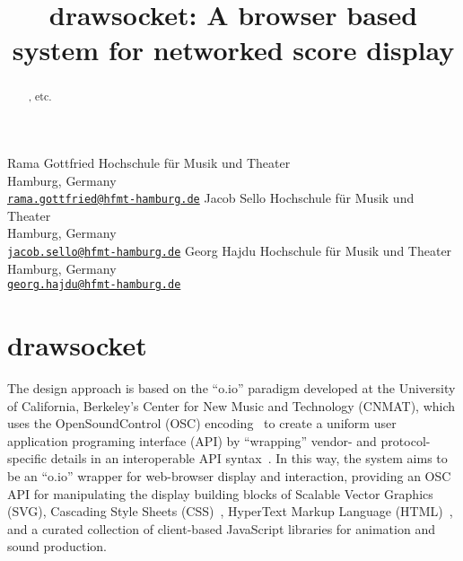 

\def\papertitle{drawsocket: A browser based system for networked score display%
}
\def\firstauthor{Rama Gottfried}
\def\secondauthor{Jacob Sello}
\def\thirdauthor{Georg Hajdu}

\title{\papertitle}
 \threeauthors
   {\firstauthor} {
   Hochschule f\"ur Musik und Theater\\
   Hamburg, Germany \\ %
   \small{\tt \href{mailto:rama.gottfried@hfmt-hamburg.de}{rama.gottfried@hfmt-hamburg.de}}}
    {\secondauthor} {
   Hochschule f\"ur Musik und Theater\\
   Hamburg, Germany \\ %
   \small{\tt \href{mailto:jacob.sello@hfmt-hamburg.de}{jacob.sello@hfmt-hamburg.de}}}
   {\thirdauthor} {
   Hochschule f\"ur Musik und Theater\\
   Hamburg, Germany \\ %
   \small{\tt \href{mailto:georg.hajdu@hfmt-hamburg.de}{georg.hajdu@hfmt-hamburg.de}}}





%

\capstartfalse
\maketitle
\capstarttrue
%
\begin{abstract}
 \drawsocket, \maxscore etc.

\end{abstract}





\section{drawsocket}\label{sec:drawsocket}
The \drawsocket design approach is based on the ``o.io'' paradigm developed at the University of California, Berkeley's Center for New Music and Technology (CNMAT), which uses the OpenSoundControl (OSC) encoding~\cite{wright:osc} to create a uniform user application programing interface (API) by ``wrapping'' vendor- and protocol- specific details in an interoperable API syntax~\cite{freed2014io, maccallum2015dynamic}.
In this way, the \drawsocket system aims to be an ``o.io'' wrapper for web-browser display and interaction, providing an OSC API for manipulating the display building blocks of Scalable Vector Graphics (SVG)\cite{world2000scalable}, Cascading Style Sheets (CSS)~\cite{css}, HyperText Markup Language (HTML)~\cite{Faulkner:16:H}, and a curated collection of client-based JavaScript libraries for animation and sound production.

